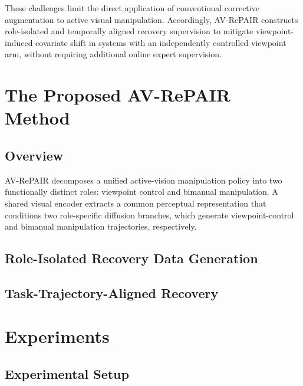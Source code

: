 \documentclass[letterpaper, 10 pt, conference]{ieeeconf}  %
\begin{document}
These challenges limit the direct application of conventional corrective augmentation to active visual manipulation. Accordingly, AV-RePAIR constructs role-isolated and temporally aligned recovery supervision to mitigate viewpoint-induced covariate shift in systems with an independently controlled viewpoint arm, without requiring additional online expert supervision.




\section{The Proposed AV-RePAIR Method}
\subsection{Overview}
AV-RePAIR decomposes a unified active-vision manipulation policy into two functionally distinct roles: viewpoint control and bimanual manipulation. A shared visual encoder extracts a common perceptual representation that conditions two role-specific diffusion branches, which generate viewpoint-control and bimanual manipulation trajectories, respectively.
\subsection{Role-Isolated Recovery Data Generation}
\subsection{Task-Trajectory-Aligned Recovery}

\section{Experiments}
\subsection{Experimental Setup}
\end{document}
